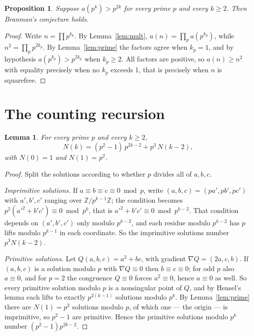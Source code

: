 \documentclass[11pt,a4paper]{article}
\theoremstyle{plain}
\newtheorem{lemma}[theorem]{Lemma}
\newtheorem{proposition}[theorem]{Proposition}
\theoremstyle{definition}
\begin{document}
\begin{proposition}\label{prop:reduce}
Suppose $a(p^{k})>p^{2k}$ for every prime $p$ and every $k\ge2$. Then Branman's conjecture
holds.
\end{proposition}

\begin{proof}
Write $n=\prod p^{k_{p}}$. By Lemma~\ref{lem:mult}, $a(n)=\prod_{p}a(p^{k_{p}})$, while
$n^{2}=\prod_{p}p^{2k_{p}}$. By Lemma~\ref{lem:prime} the factors agree when $k_{p}=1$, and
by hypothesis $a(p^{k_{p}})>p^{2k_{p}}$ when $k_{p}\ge2$. All factors are positive, so
$a(n)\ge n^{2}$ with equality precisely when no $k_{p}$ exceeds 1, that is precisely when
$n$ is squarefree.
\end{proof}

\section{The counting recursion}

\begin{lemma}\label{lem:rec}
For every prime $p$ and every $k\ge2$,
\[
  N(k)=(p^{2}-1)\,p^{2k-2}+p^{3}\,N(k-2),
\]
with $N(0)=1$ and $N(1)=p^{2}$.
\end{lemma}

\begin{proof}
Split the solutions according to whether $p$ divides all of $a,b,c$.

\emph{Imprimitive solutions.} If $a\equiv b\equiv c\equiv0\bmod p$, write
$(a,b,c)=(pa',pb',pc')$ with $a',b',c'$ ranging over $\mathbb{Z}/p^{k-1}\mathbb{Z}$; the
condition becomes $p^{2}(a'^{2}+b'c')\equiv0\bmod p^{k}$, that is
$a'^{2}+b'c'\equiv0\bmod p^{k-2}$. That condition depends on $(a',b',c')$ only modulo
$p^{k-2}$, and each residue modulo $p^{k-2}$ has $p$ lifts modulo $p^{k-1}$ in each
coordinate. So the imprimitive solutions number $p^{3}N(k-2)$.

\emph{Primitive solutions.} Let $Q(a,b,c)=a^{2}+bc$, with gradient $\nabla Q=(2a,c,b)$. If
$(a,b,c)$ is a solution modulo $p$ with $\nabla Q\equiv0$ then $b\equiv c\equiv0$; for odd
$p$ also $a\equiv0$, and for $p=2$ the congruence $Q\equiv0$ forces $a^{2}\equiv0$, hence
$a\equiv0$ as well. So every primitive solution modulo $p$ is a nonsingular point of $Q$,
and by Hensel's lemma each lifts to exactly $p^{2(k-1)}$ solutions modulo $p^{k}$. By
Lemma~\ref{lem:prime} there are $N(1)=p^{2}$ solutions modulo $p$, of which one --- the
origin --- is imprimitive, so $p^{2}-1$ are primitive. Hence the primitive solutions modulo
$p^{k}$ number $(p^{2}-1)p^{2k-2}$.
\end{proof}
\end{document}
